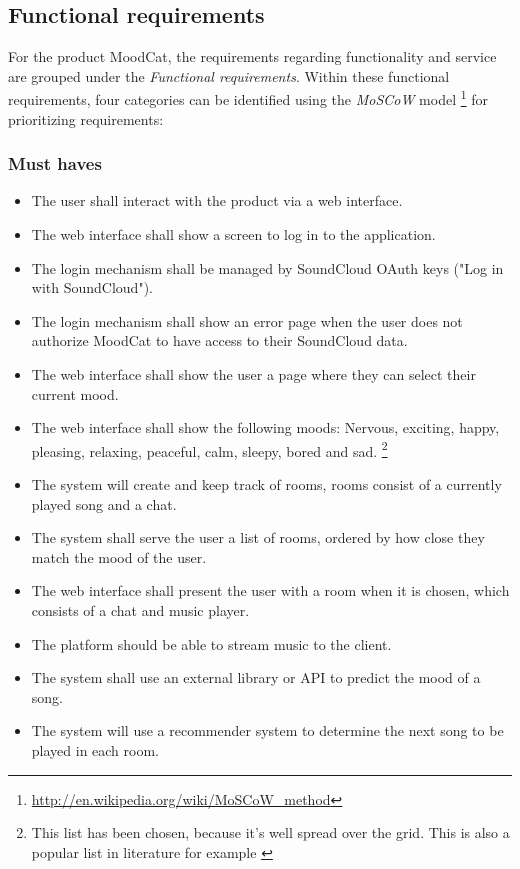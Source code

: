 
\subsection{Functional requirements}
For the product MoodCat, the requirements regarding functionality and service are grouped under the \emph{Functional requirements}.
Within these functional requirements, four categories can be identified using the \emph{MoSCoW} model \footnote{\url{http://en.wikipedia.org/wiki/MoSCoW_method}} for prioritizing requirements:

\subsubsection{Must haves}
\begin{itemize}
\item The user shall interact with the product via a web interface.

\item The web interface shall show a screen to log in to the application.

\item The login mechanism shall be managed by SoundCloud OAuth keys ("Log in with SoundCloud").

\item The login mechanism shall show an error page when the user does not authorize MoodCat to have access to their SoundCloud data.

\item The web interface shall show the user a page where they can select their current mood.

\item The web interface shall show the following moods:
 Nervous, exciting, happy, pleasing, relaxing, peaceful, calm, sleepy, bored and sad. \footnote{This list has been chosen, because it's well spread over the grid. This is also a popular list in literature for example \cite{Book}}

\item The system will create and keep track of rooms, rooms consist of a currently played song and a chat.

\item The system shall serve the user a list of rooms, ordered by how close they match the mood of the user.

\item The web interface shall present the user with a room when it is chosen, which consists of a chat and music player.
	
\item The platform should be able to stream music to the client.

\item The system shall use an external library or API to predict the mood of a song.

\item The system will use a recommender system to determine the next song to be played in each room.

\end{itemize}
